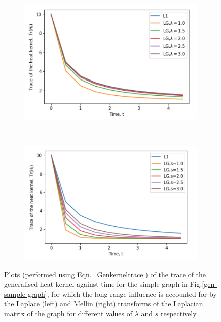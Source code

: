 \documentclass[10pt,a4paper]{article}
\theoremstyle{plain}
\theoremstyle{definition}
\begin{document}
        \begin{figure}[H]
        	\centering
        	\begin{subfigure}[b]{0.45\textwidth}
        		\includegraphics[width= \textwidth]{images/Laplace-trace-simple.png}
        		\caption{}
        		\label{model1-mellin}
        	\end{subfigure}~
        	\begin{subfigure}[b]{0.45\textwidth}
        		\includegraphics[width= \textwidth]{images/Mellin-trace-simple.png}
        		\caption{}
        		\label{model2-mellin}
        	\end{subfigure} 
        	\caption{Plots (performed using Eqn.~\ref{Genkerneltrace}) of the trace of the generalised heat kernel against time for the simple graph in Fig.\ref{gen-sample-graph}, for which the long-range influence is accounted for by the Laplace (left) and Mellin (right) transforms of the Laplacian matrix of the graph for different values of $\lambda$ and $s$ respectively.}
        	\label{toy-Mellin-Laplce-simulations}
        \end{figure}
    
\end{document}

